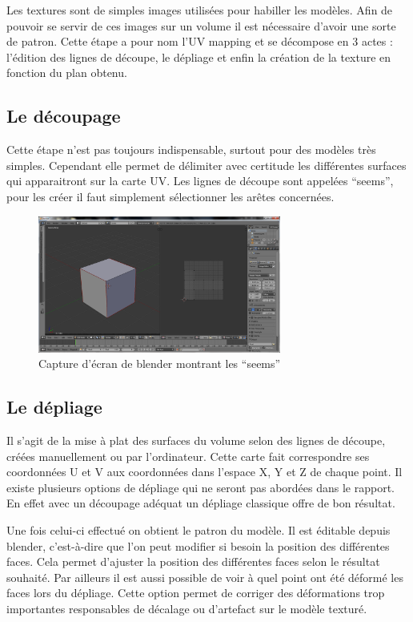 \documentclass[11pt]{report}
\begin{document}
Les textures sont de simples images utilisées pour habiller les modèles. Afin de pouvoir se servir de ces images sur un volume il est nécessaire d’avoir une sorte de patron. Cette étape a pour nom l’UV mapping et se décompose en 3 actes : l’édition des lignes de découpe, le dépliage et enfin la création de la texture en fonction du plan obtenu.

\subsection{Le découpage}

Cette étape n’est pas toujours indispensable, surtout pour des modèles très simples. Cependant elle permet de délimiter avec certitude les différentes surfaces qui apparaitront sur la carte UV. Les lignes de découpe sont appelées ``seems'', pour les créer il faut simplement sélectionner les arêtes concernées. 

\begin{figure}[htbp]
\centering
\includegraphics[width=8cm]{seems.png}
\caption{Capture d'écran de blender montrant les ``seems''}
\end{figure}

\subsection{Le dépliage}

Il s’agit de la mise à plat des surfaces du volume selon des lignes de découpe, créées manuellement ou par l’ordinateur. Cette carte fait correspondre ses coordonnées U et V aux coordonnées dans l’espace X, Y et Z de chaque point. Il existe plusieurs options de dépliage qui ne seront pas abordées dans le rapport. En effet avec un découpage adéquat un dépliage classique offre de bon résultat. 

Une fois celui-ci effectué on obtient le patron du modèle. Il est éditable depuis blender, c’est-à-dire que l’on peut modifier si besoin la position des différentes faces. Cela permet d’ajuster la position des différentes faces selon le résultat souhaité. Par ailleurs il est aussi possible de voir à quel point ont été déformé les faces lors du dépliage. Cette option permet de corriger des déformations trop importantes responsables de décalage ou d’artefact sur le modèle texturé.
\end{document}
